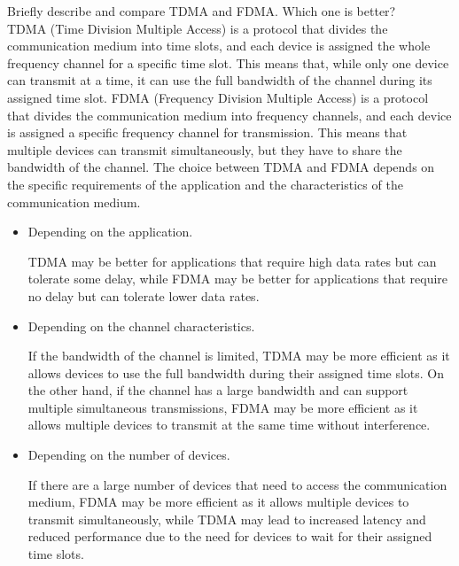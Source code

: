 \begin{ejercicio}
    Briefly describe and compare TDMA and FDMA. Which one is better?\\

    TDMA (Time Division Multiple Access) is a protocol that divides the communication medium into time slots, and each device is assigned the whole frequency channel for a specific time slot. This means that, while only one device can transmit at a time, it can use the full bandwidth of the channel during its assigned time slot. FDMA (Frequency Division Multiple Access) is a protocol that divides the communication medium into frequency channels, and each device is assigned a specific frequency channel for transmission. This means that multiple devices can transmit simultaneously, but they have to share the bandwidth of the channel.
    The choice between TDMA and FDMA depends on the specific requirements of the application and the characteristics of the communication medium. 
    \begin{itemize}
        \item Depending on the application.
        
        TDMA may be better for applications that require high data rates but can tolerate some delay, while FDMA may be better for applications that require no delay but can tolerate lower data rates.

        \item Depending on the channel characteristics.
        
        If the bandwidth of the channel is limited, TDMA may be more efficient as it allows devices to use the full bandwidth during their assigned time slots. On the other hand, if the channel has a large bandwidth and can support multiple simultaneous transmissions, FDMA may be more efficient as it allows multiple devices to transmit at the same time without interference.

        \item Depending on the number of devices.
        
        If there are a large number of devices that need to access the communication medium, FDMA may be more efficient as it allows multiple devices to transmit simultaneously, while TDMA may lead to increased latency and reduced performance due to the need for devices to wait for their assigned time slots.
    \end{itemize}
\end{ejercicio}

